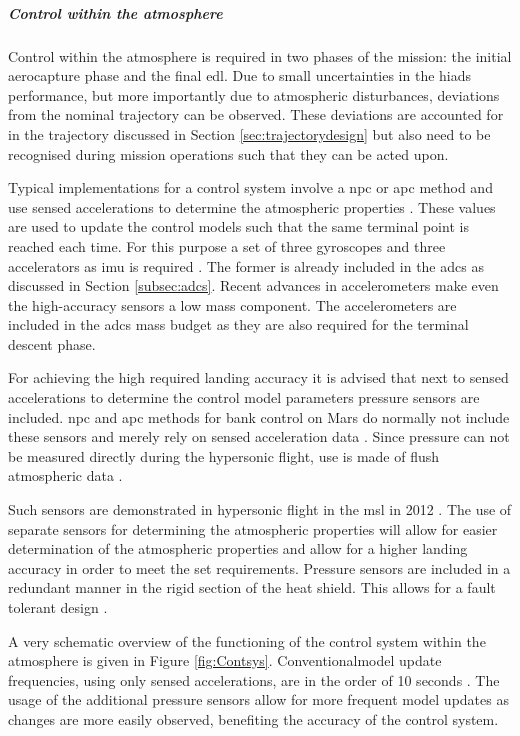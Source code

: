 \subparagraph{Control within the atmosphere}

Control within the atmosphere is required in two phases of the mission: the initial aerocapture phase and the final \gls{edl}. Due to small uncertainties in the \glspl{hiad} performance, but more importantly due to atmospheric disturbances, deviations from the nominal trajectory can be observed. These deviations are accounted for in the trajectory discussed in Section \ref{sec:trajectorydesign} but also need to be recognised during mission operations such that they can be acted upon. 

Typical implementations for a control system involve a \gls{npc} or \gls{apc} method and use sensed accelerations to determine the atmospheric properties \cite{Davis2010}. These values are used to update the control models such that the same terminal point is reached each time. For this purpose a set of three gyroscopes and three accelerators as \gls{imu} is required \cite{Dutta2013}. The former is already included in the \gls{adcs} as discussed in Section \ref{subsec:adcs}. Recent advances in accelerometers make even the high-accuracy sensors a low mass component. The accelerometers are included in the \gls{adcs} mass budget as they are also required for the terminal descent phase. 

For achieving the high required landing accuracy it is advised that next to sensed accelerations to determine the control model parameters pressure sensors are included.  \gls{npc} and \gls{apc} methods for bank control on Mars do normally not include these sensors and merely rely on sensed acceleration data \cite{Lu2007, Davis2010}. Since pressure can not be measured directly during the hypersonic flight, use is made of flush atmospheric data \cite{Dutta2013}. 
 
Such sensors are demonstrated in hypersonic flight in the \gls{msl} in 2012 \cite{Dutta2013}. The use of separate sensors for determining the atmospheric properties will allow for easier determination of the atmospheric properties and allow for a higher landing accuracy in order to meet the set requirements.
Pressure sensors are included in a redundant manner in the rigid section of the heat shield. This allows for a fault tolerant design \cite{Whitmore1995}. 

A very schematic overview of the functioning of the control system within the atmosphere is given in Figure \ref{fig:Contsys}. Conventionalmodel update frequencies, using only sensed accelerations, are in the order of 10 seconds \cite{Davis2010}. The usage of the additional pressure sensors allow for more frequent model updates as changes are more easily observed, benefiting the accuracy of the control system.


